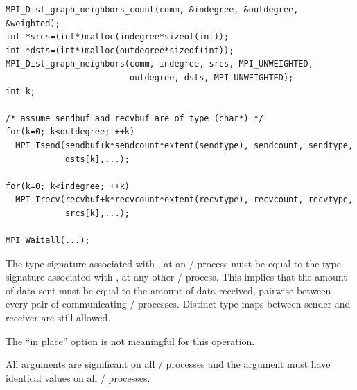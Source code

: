 \begin{lstlisting}[language={[MPI]C}]
MPI_Dist_graph_neighbors_count(comm, &indegree, &outdegree, &weighted);
int *srcs=(int*)malloc(indegree*sizeof(int));
int *dsts=(int*)malloc(outdegree*sizeof(int));
MPI_Dist_graph_neighbors(comm, indegree, srcs, MPI_UNWEIGHTED,
                         outdegree, dsts, MPI_UNWEIGHTED);
int k;

/* assume sendbuf and recvbuf are of type (char*) */
for(k=0; k<outdegree; ++k)
  MPI_Isend(sendbuf+k*sendcount*extent(sendtype), sendcount, sendtype,
            dsts[k],...); 

for(k=0; k<indegree; ++k)
  MPI_Irecv(recvbuf+k*recvcount*extent(recvtype), recvcount, recvtype,
            srcs[k],...);

MPI_Waitall(...);
\end{lstlisting}

The type signature associated with , 
at an \MPI/ process must be equal to the type signature associated with
,  at any other \MPI/ process.
This implies that the amount of data sent must be equal to the
amount of data received, pairwise between every pair of
communicating \MPI/ processes.
Distinct type maps between sender and receiver are still allowed.
 
The ``in place'' option is not meaningful for this operation.

All arguments are significant on all \MPI/ processes and the argument
 must have identical values on all \MPI/ processes.

